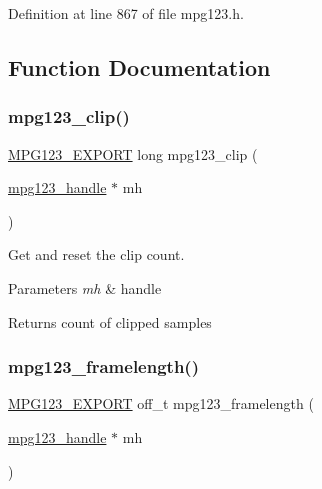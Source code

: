 Definition at line 867 of file mpg123.\+h.



\subsection{Function Documentation}
\mbox{\label{group__mpg123__status_gadb294b6e7c73dc58190b6fa2f024042d}} 
\subsubsection{\texorpdfstring{mpg123\_clip()}{mpg123\_clip()}}
{\footnotesize\ttfamily \mbox{\hyperlink{mpg123_8h_a2ba98cfba3f760879df70e755b2a61cc}{M\+P\+G123\+\_\+\+E\+X\+P\+O\+RT}} long mpg123\+\_\+clip (\begin{DoxyParamCaption}\item[{\mbox{\hyperlink{group__mpg123__init_ga6728e2839a395f3a07d4514da659faca}{mpg123\+\_\+handle}} $\ast$}]{mh }\end{DoxyParamCaption})}

Get and reset the clip count. 
\begin{DoxyParams}{Parameters}
{\em mh} & handle \\
\hline
\end{DoxyParams}
\begin{DoxyReturn}{Returns}
count of clipped samples 
\end{DoxyReturn}
\mbox{\label{group__mpg123__status_gabf4a6c8f3b251acfa05fd7737a076370}} 
\subsubsection{\texorpdfstring{mpg123\_framelength()}{mpg123\_framelength()}}
{\footnotesize\ttfamily \mbox{\hyperlink{mpg123_8h_a2ba98cfba3f760879df70e755b2a61cc}{M\+P\+G123\+\_\+\+E\+X\+P\+O\+RT}} off\+\_\+t mpg123\+\_\+framelength (\begin{DoxyParamCaption}\item[{\mbox{\hyperlink{group__mpg123__init_ga6728e2839a395f3a07d4514da659faca}{mpg123\+\_\+handle}} $\ast$}]{mh }\end{DoxyParamCaption})}

